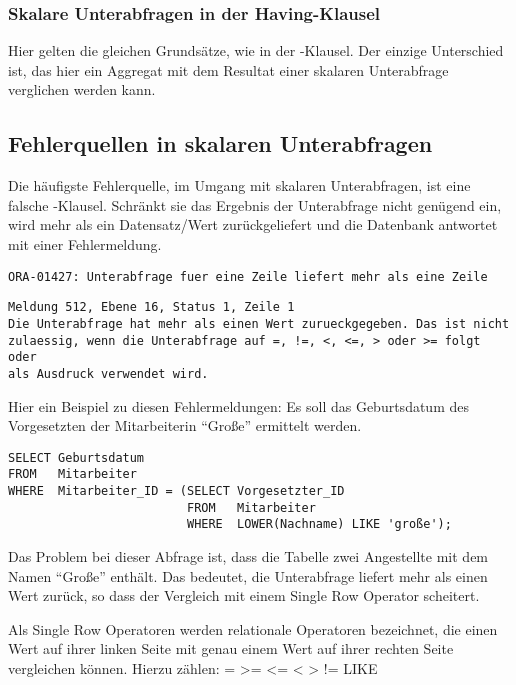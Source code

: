         \subsubsection{Skalare Unterabfragen in der Having-Klausel}
        Hier gelten die gleichen Grunds\"atze, wie in der \WHERE-Klausel. Der einzige Unterschied ist, das hier ein Aggregat mit dem Resultat einer skalaren Unterabfrage verglichen werden kann.
      \subsection{Fehlerquellen in skalaren Unterabfragen}
        Die h\"aufigste Fehlerquelle, im Umgang mit skalaren Unterabfragen, ist eine falsche \WHERE-Klausel. Schr\"ankt sie das Ergebnis der Unterabfrage nicht gen\"ugend ein, wird mehr als ein Datensatz/Wert zur\"uckgeliefert und die Datenbank antwortet mit einer Fehlermeldung.
          \begin{lstlisting}[language=oracle_sql,caption={Mehr als eine Zeile: Fehlermeldung in Oracle},label=sql06_04]
ORA-01427: Unterabfrage fuer eine Zeile liefert mehr als eine Zeile
          \end{lstlisting}
          \begin{lstlisting}[language=ms_sql,caption={Mehr als eine Zeile: Fehlermeldung in SQL Server},label=sql06_05]
Meldung 512, Ebene 16, Status 1, Zeile 1
Die Unterabfrage hat mehr als einen Wert zurueckgegeben. Das ist nicht
zulaessig, wenn die Unterabfrage auf =, !=, <, <=, > oder >= folgt oder
als Ausdruck verwendet wird.
          \end{lstlisting}
          Hier ein Beispiel zu diesen Fehlermeldungen: Es soll das Geburtsdatum des Vorgesetzten der Mitarbeiterin \enquote{Gro\ss{}e} ermittelt werden.
          \begin{lstlisting}[language=oracle_sql,caption={Eine Single Row Unterabfrage mit Problemen!},label=sql06_06]
SELECT Geburtsdatum
FROM   Mitarbeiter
WHERE  Mitarbeiter_ID = (SELECT Vorgesetzter_ID
                         FROM   Mitarbeiter
                         WHERE  LOWER(Nachname) LIKE 'große');
          \end{lstlisting}
          Das Problem bei dieser Abfrage ist, dass die Tabelle  zwei Angestellte mit dem Namen \enquote{Gro\ss{}e} enth\"alt. Das bedeutet, die Unterabfrage liefert mehr als einen Wert zur\"uck, so dass der Vergleich mit einem Single Row Operator scheitert.
          \begin{merke}
            Als Single Row Operatoren werden relationale Operatoren bezeichnet, die einen Wert auf ihrer linken Seite mit genau einem Wert auf ihrer rechten Seite vergleichen k\"onnen. Hierzu z\"ahlen: = >= <= < > != LIKE
          \end{merke}
